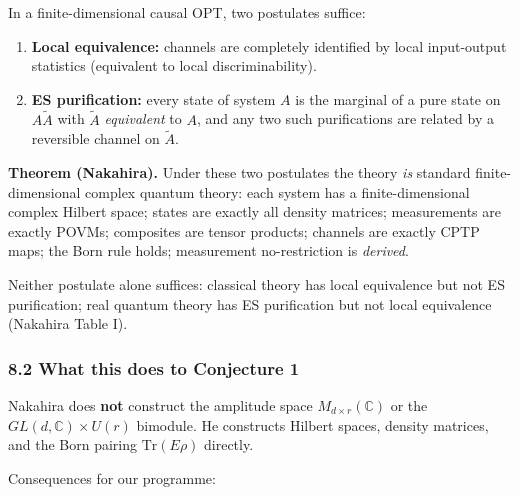 \documentclass[
]{article}
\providecommand{\tightlist}{%
  \setlength{\itemsep}{0pt}\setlength{\parskip}{0pt}}
\begin{document}
In a finite-dimensional causal OPT, two postulates suffice:

\begin{enumerate}
\def\labelenumi{\arabic{enumi}.}
\tightlist
\item
  \textbf{Local equivalence:} channels are completely identified by
  local input-output statistics (equivalent to local discriminability).
\item
  \textbf{ES purification:} every state of system \(A\) is the marginal
  of a pure state on \(A\tilde A\) with \(\tilde A\) \emph{equivalent}
  to \(A\), and any two such purifications are related by a reversible
  channel on \(\tilde A\).
\end{enumerate}

\textbf{Theorem (Nakahira).} Under these two postulates the theory
\emph{is} standard finite-dimensional complex quantum theory: each
system has a finite-dimensional complex Hilbert space; states are
exactly all density matrices; measurements are exactly POVMs; composites
are tensor products; channels are exactly CPTP maps; the Born rule
holds; measurement no-restriction is \emph{derived}.

Neither postulate alone suffices: classical theory has local equivalence
but not ES purification; real quantum theory has ES purification but not
local equivalence (Nakahira Table I).

\subsubsection{8.2 What this does to Conjecture
1}\label{what-this-does-to-conjecture-1}

Nakahira does \textbf{not} construct the amplitude space
\(M_{d\times r}(\mathbb C)\) or the \(GL(d,\mathbb C)\times U(r)\)
bimodule. He constructs Hilbert spaces, density matrices, and the Born
pairing \(\mathrm{Tr}(E\rho)\) directly.

Consequences for our programme:
\end{document}
